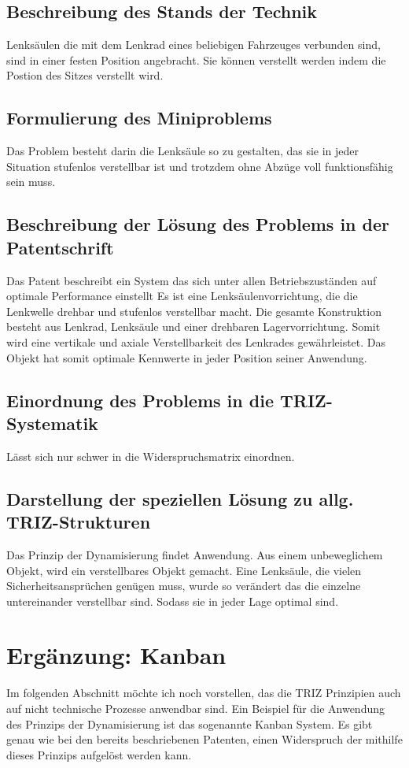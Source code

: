 \documentclass{article}
\begin{document}
\subsection{Beschreibung des Stands der Technik}
Lenksäulen die mit dem Lenkrad eines beliebigen Fahrzeuges verbunden sind, sind in einer festen Position angebracht. Sie können verstellt werden indem die Postion des Sitzes verstellt wird. 
\subsection{Formulierung des Miniproblems}
Das Problem besteht darin die Lenksäule so zu gestalten, das sie in jeder Situation stufenlos verstellbar ist und trotzdem ohne Abzüge voll funktionsfähig sein muss.
\subsection{Beschreibung der Lösung des Problems in der Patentschrift}
Das Patent beschreibt ein System das sich unter allen Betriebszuständen auf
optimale Performance einstellt
Es ist eine Lenksäulenvorrichtung, die die Lenkwelle drehbar und
stufenlos verstellbar macht.
Die gesamte Konstruktion besteht aus Lenkrad, Lenksäule und einer drehbaren Lagervorrichtung. 
Somit wird eine vertikale und axiale Verstellbarkeit des Lenkrades gewährleistet.
Das Objekt hat somit optimale Kennwerte in jeder Position seiner Anwendung.
\subsection{Einordnung des Problems in die TRIZ-Systematik}
Lässt sich nur schwer in die Widerspruchsmatrix einordnen.
\subsection{Darstellung der speziellen Lösung zu allg. TRIZ-Strukturen}
Das Prinzip der Dynamisierung findet Anwendung. Aus einem unbeweglichem Objekt, wird ein verstellbares Objekt gemacht. Eine Lenksäule, die vielen Sicherheitsansprüchen genügen muss, wurde so verändert das die einzelne untereinander verstellbar sind. Sodass sie in jeder Lage optimal sind.

\section{Ergänzung: Kanban}
Im folgenden Abschnitt möchte ich noch vorstellen, das die TRIZ Prinzipien auch auf nicht technische Prozesse anwendbar sind. Ein Beispiel für die Anwendung des Prinzips der Dynamisierung ist das sogenannte Kanban System.
Es gibt genau wie bei den bereits beschriebenen Patenten, einen Widerspruch der mithilfe dieses Prinzips aufgelöst werden kann. 
\end{document}
